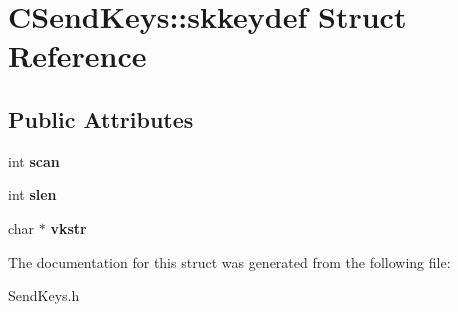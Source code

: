 \hypertarget{struct_c_send_keys_1_1skkeydef}{\section{C\-Send\-Keys\-:\-:skkeydef Struct Reference}
\label{struct_c_send_keys_1_1skkeydef}
}
\subsection*{Public Attributes}
\begin{DoxyCompactItemize}
\item 
\hypertarget{struct_c_send_keys_1_1skkeydef_a49452e526892d15e613f0a6ec78901d3}{int {\bfseries scan}}\label{struct_c_send_keys_1_1skkeydef_a49452e526892d15e613f0a6ec78901d3}

\item 
\hypertarget{struct_c_send_keys_1_1skkeydef_abd625b741ca403845ed3d057ccd47c67}{int {\bfseries slen}}\label{struct_c_send_keys_1_1skkeydef_abd625b741ca403845ed3d057ccd47c67}

\item 
\hypertarget{struct_c_send_keys_1_1skkeydef_a221ffa616514cf22d85f490ef6e9de90}{char $\ast$ {\bfseries vkstr}}\label{struct_c_send_keys_1_1skkeydef_a221ffa616514cf22d85f490ef6e9de90}

\end{DoxyCompactItemize}


The documentation for this struct was generated from the following file\-:\begin{DoxyCompactItemize}
\item 
Send\-Keys.\-h\end{DoxyCompactItemize}
